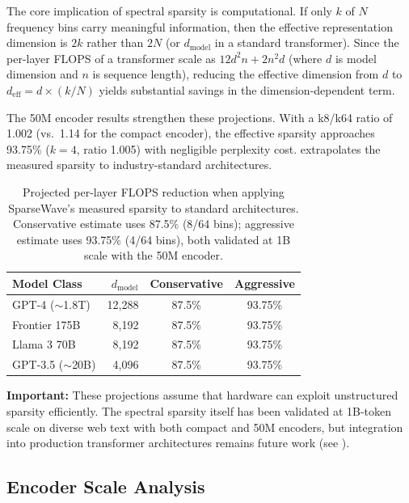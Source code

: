 \documentclass[10pt,twocolumn]{article}
\begin{document}
The core implication of spectral sparsity is computational. If only $k$ of $N$ frequency bins carry meaningful information, then the effective representation dimension is $2k$ rather than $2N$ (or $d_\text{model}$ in a standard transformer). Since the per-layer FLOPS of a transformer scale as $12d^2n + 2n^2d$ (where $d$ is model dimension and $n$ is sequence length), reducing the effective dimension from $d$ to $d_\text{eff} = d \times (k/N)$ yields substantial savings in the dimension-dependent term.

The 50M encoder results strengthen these projections. With a k8/k64 ratio of 1.002 (vs.\ 1.14 for the compact encoder), the effective sparsity approaches 93.75\% ($k = 4$, ratio 1.005) with negligible perplexity cost.  extrapolates the measured sparsity to industry-standard architectures.

\begin{table}[t]
\centering
\caption{Projected per-layer FLOPS reduction when applying SparseWave's measured sparsity to standard architectures. Conservative estimate uses 87.5\% (8/64 bins); aggressive estimate uses 93.75\% (4/64 bins), both validated at 1B scale with the 50M encoder.}
\label{tab:flops_projections}
\small
\begin{tabular}{@{}lrcc@{}}
\toprule
\textbf{Model Class} & $d_\text{model}$ & \textbf{Conservative} & \textbf{Aggressive} \\
\midrule
GPT-4 ($\sim$1.8T)     & 12,288 & 87.5\% & 93.75\% \\
Frontier 175B           & 8,192  & 87.5\% & 93.75\% \\
Llama 3 70B             & 8,192  & 87.5\% & 93.75\% \\
GPT-3.5 ($\sim$20B)     & 4,096  & 87.5\% & 93.75\% \\
\bottomrule
\end{tabular}
\end{table}

\textbf{Important:} These projections assume that hardware can exploit unstructured sparsity efficiently. The spectral sparsity itself has been validated at 1B-token scale on diverse web text with both compact and 50M encoders, but integration into production transformer architectures remains future work (see ).

\subsection{Encoder Scale Analysis}
\end{document}
